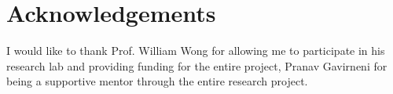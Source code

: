 
\newpage
\section*{Acknowledgements}
I would like to thank Prof. William Wong for allowing me to participate in his research lab and providing funding for the entire project, Pranav Gavirneni for being a supportive mentor through the entire research project.